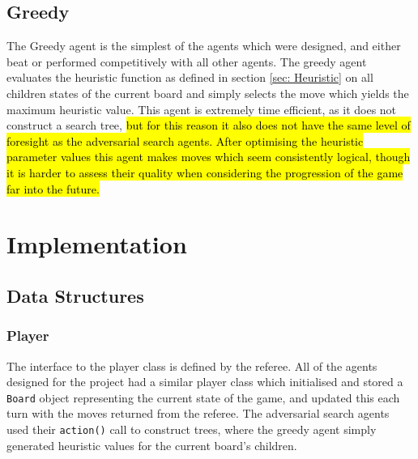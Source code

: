 \documentclass{article}
\begin{document}
\subsection{Greedy}
The Greedy agent is the simplest of the agents which were designed, and either beat or performed competitively with all other agents. The greedy agent evaluates the heuristic function as defined in section \ref{sec: Heuristic} on all children states of the current board and simply selects the move which yields the maximum heuristic value. This agent is extremely time efficient, as it does not construct a search tree, \hl{but for this reason it also does not have the same level of foresight as the adversarial search agents. After optimising the heuristic parameter values this agent makes moves which seem consistently logical, though it is harder to assess their quality when considering the progression of the game far into the future.} 

\section{Implementation}
\subsection{Data Structures}
\label{sec: Data Structures}
\subsubsection{Player}
The interface to the player class is defined by the referee. All of the agents designed for the project had a similar player class which initialised and stored a \verb|Board| object representing the current state of the game, and updated this each turn with the moves returned from the referee. The adversarial search agents used their \verb|action()| call to construct trees, where the greedy agent simply generated heuristic values for the current board's children.
\end{document}
